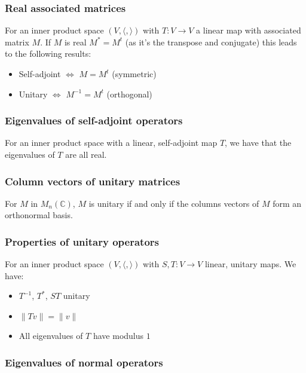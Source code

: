 \documentclass[a4paper, 12pt, twoside]{article}
\begin{document}
\subsubsection{Real associated matrices}

For an inner product space $(V, \langle , \rangle)$ with 
$T : V \to V$ a linear map with associated matrix $M$.
If $M$ is real $M^* = M^t$ (as it's the transpose and conjugate)
this leads to the following results:
\begin{itemize}
  \item Self-adjoint $\Leftrightarrow$ $M = M^t$ (symmetric)
  \item Unitary $\Leftrightarrow$ $M^{-1} = M^t$ (orthogonal)
\end{itemize}

\subsubsection{Eigenvalues of self-adjoint operators}

For an inner product space with a linear, self-adjoint map $T$, we
have that the eigenvalues of $T$ are all real.  

\subsubsection{Column vectors of unitary matrices}

For $M$ in $M_n(\mathbb{C})$, $M$ is unitary if and only if
the columns vectors of $M$ form an orthonormal basis.

\subsubsection{Properties of unitary operators}

For an inner product space $(V, \langle , \rangle)$ with 
$S, T : V \to V$ linear, unitary maps. We have:
\begin{itemize}
  \item $T^{-1}$, $T^*$, $ST$ unitary
  \item $\|Tv\| = \|v\|$
  \item All eigenvalues of $T$ have modulus $1$
\end{itemize}

\subsubsection{Eigenvalues of normal operators}
\end{document}

